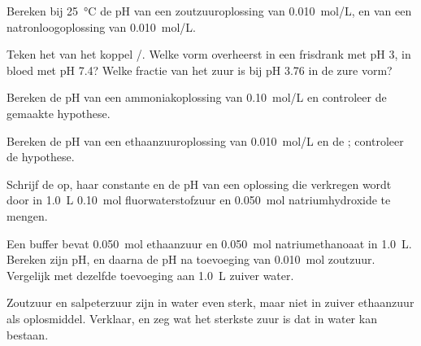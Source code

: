 \begin{exercise}[$\star$]\label{exo:b1:predominant-reaction:3}
Bereken bij \qty{25}{\celsius} de pH van een zoutzuuroplossing van
\qty{0.010}{mol/L}, en van een natronloogoplossing van
\qty{0.010}{mol/L}.
\end{exercise}

\begin{exercise}[$\star$]\label{exo:b1:predominant-reaction:4}
Teken het  van het koppel /.
Welke vorm overheerst in een frisdrank met pH 3, in bloed met pH 7.4?
Welke fractie van het zuur is bij pH 3.76 in de zure vorm?
\end{exercise}

\begin{exercise}[$\star\star$]\label{exo:b1:predominant-reaction:5}
Bereken de pH van een ammoniakoplossing van \qty{0.10}{mol/L} en
controleer de gemaakte hypothese.
\end{exercise}

\begin{exercise}[$\star\star$]\label{exo:b1:predominant-reaction:6}
Bereken de pH van een ethaanzuuroplossing van \qty{0.010}{mol/L} en de
; controleer de hypothese.
\end{exercise}

\begin{exercise}[$\star\star$]\label{exo:b1:predominant-reaction:7}
Schrijf de  op, haar constante en de pH van een
oplossing die verkregen wordt door in \qty{1.0}{L} \qty{0.10}{mol}
fluorwaterstofzuur en \qty{0.050}{mol} natriumhydroxide te mengen.
\end{exercise}

\begin{exercise}[$\star\star$]\label{exo:b1:predominant-reaction:8}
Een buffer bevat \qty{0.050}{mol} ethaanzuur en \qty{0.050}{mol}
natriumethanoaat in \qty{1.0}{L}. Bereken zijn pH, en daarna de pH na
toevoeging van \qty{0.010}{mol} zoutzuur. Vergelijk met dezelfde
toevoeging aan \qty{1.0}{L} zuiver water.
\end{exercise}

\begin{exercise}[$\star\star$]\label{exo:b1:predominant-reaction:9}
Zoutzuur en salpeterzuur zijn in water even sterk, maar niet in zuiver
ethaanzuur als oplosmiddel. Verklaar, en zeg wat het sterkste zuur is dat
in water kan bestaan.
\end{exercise}

